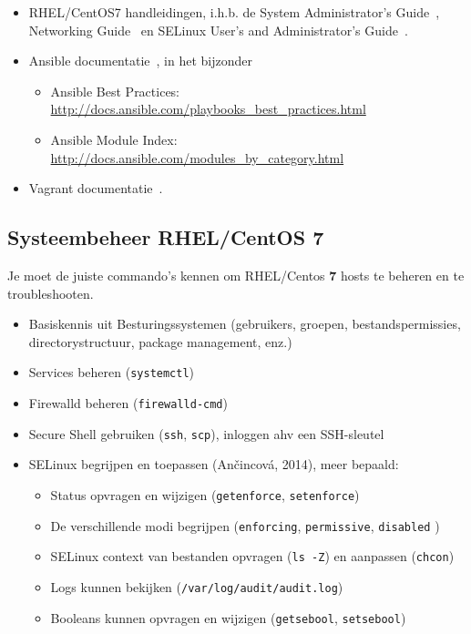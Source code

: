 \begin{itemize}
  \item RHEL/CentOS7 handleidingen, i.h.b. de System Administrator's Guide~\autocite{SvistunovEtAl2016}, Networking Guide~\autocite{JahodaEtAl2016} en SELinux User's and Administrator's Guide~\autocite{JahodaEtAl2016a}.
\item Ansible documentatie~\autocite{Ansible2016}, in het bijzonder

  \begin{itemize}
  \item Ansible Best Practices: \url{http://docs.ansible.com/playbooks_best_practices.html}
  \item Ansible Module Index: \url{http://docs.ansible.com/modules_by_category.html}
  \end{itemize}
\item Vagrant documentatie~\autocite{Hashicorp}.
\end{itemize}

\subsection{Systeembeheer RHEL/CentOS 7}
\label{subs:systeembeheer-rhelcentos-7}

Je moet de juiste commando's kennen om RHEL/Centos \textbf{7} hosts te
beheren en te troubleshooten.

\begin{itemize}
\item Basiskennis uit Besturingssystemen (gebruikers, groepen, bestandspermissies, directorystructuur, package management, enz.)
\item Services beheren (\texttt{systemctl})
\item Firewalld beheren (\texttt{firewalld-cmd})
\item Secure Shell gebruiken (\texttt{ssh}, \texttt{scp}), inloggen ahv een SSH-sleutel
\item SELinux begrijpen en toepassen (Ančincová, 2014), meer bepaald:

  \begin{itemize}
  \item Status opvragen en wijzigen (\texttt{getenforce}, \texttt{setenforce})
  \item De verschillende modi begrijpen (\texttt{enforcing}, \texttt{permissive}, \texttt{disabled} )
  \item SELinux context van bestanden opvragen (\texttt{ls\ -Z}) en aanpassen (\texttt{chcon})
  \item Logs kunnen bekijken (\texttt{/var/log/audit/audit.log})
  \item Booleans kunnen opvragen en wijzigen (\texttt{getsebool}, \texttt{setsebool})
  \end{itemize}
\end{itemize}

